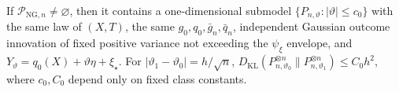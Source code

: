 If \(\mathcal P_{\mathrm{NG},n}\neq\varnothing\), then it contains a one-dimensional submodel \(\{P_{n,\vartheta}:|\vartheta|\le c_0\}\) with the same law of \((X,T)\), the same \(g_0,q_0,\bar g_n,\bar q_n\), independent Gaussian outcome innovation of fixed positive variance not exceeding the \(\psi_{\xi}\) envelope, and \(Y_{\vartheta}=q_0(X)+\vartheta\eta+\xi_{\star}\). For \(|\vartheta_1-\vartheta_0|=h/\sqrt n\), \(D_{\mathrm{KL}}(P_{n,\vartheta_0}^{\otimes n}\|P_{n,\vartheta_1}^{\otimes n})\le C_0h^2\), where \(c_0,C_0\) depend only on fixed class constants.
